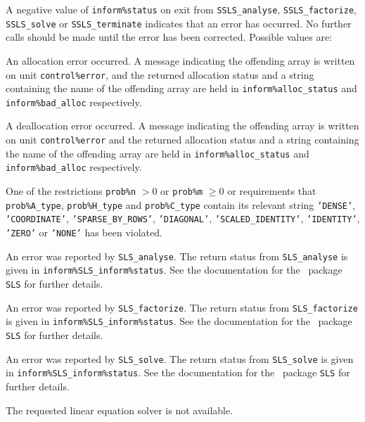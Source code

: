 \documentclass{galahad}
\newcommand{\packagename}{SSLS}
\begin{document}

\galerrors
A negative value of {\tt inform\%status} on exit from
{\tt \packagename\_analyse},
{\tt \packagename\_factorize},
{\tt \packagename\_solve}
or
{\tt \packagename\_terminate}
indicates that an error has occurred. No further calls should be made
until the error has been corrected. Possible values are:

\begin{description}

 An allocation error occurred.
A message indicating the offending
array is written on unit {\tt control\%error}, and the returned allocation
status and a string containing the name of the offending array
are held in {\tt inform\%alloc\_\-status}
and {\tt inform\%bad\_alloc} respectively.

 A deallocation error occurred.
A message indicating the offending
array is written on unit {\tt control\%error} and the returned allocation
status and a string containing the name of the offending array
are held in {\tt inform\%alloc\_\-status}
and {\tt inform\%bad\_alloc} respectively.

 One of the restrictions
   {\tt prob\%n} $> 0$ or {\tt prob\%m} $\geq  0$
    or requirements that {\tt prob\%A\_type}, {\tt prob\%H\_type} and
    {\tt prob\%C\_type} contain its relevant string
    {\tt 'DENSE'}, {\tt 'COORDINATE'}, {\tt 'SPARSE\_BY\_ROWS'},
    {\tt 'DIAGONAL'}, {\tt 'SCALED\_IDENTITY'}, {\tt 'IDENTITY'},
    {\tt 'ZERO'} or {\tt 'NONE'}
    has been violated.


 An error was reported by {\tt SLS\_analyse}. The return
status from {\tt SLS\_analyse} is given in
{\tt inform\%SLS\_inform\%status}.
See the documentation for the \galahad\ package {\tt SLS} for further details.

 An error was reported by {\tt SLS\_factorize}.
The return status from {\tt SLS\_factorize} is given in
{\tt inform\%SLS\_inform\%status}.
See the documentation for the \galahad\ package {\tt SLS} for further details.

 An error was reported by {\tt SLS\_solve}. The return
status from {\tt SLS\_solve} is given in {\tt inform\%SLS\_inform\%status}.
See the documentation for the \galahad\ package {\tt SLS} for further details.

 The requested linear equation solver is not available.

\end{description}
\end{document}
